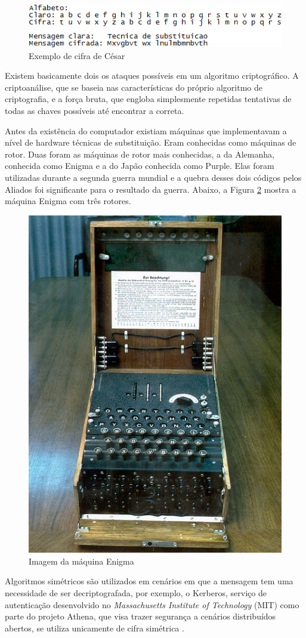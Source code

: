 \begin{figure}[H]
    \centering
    \caption{Exemplo de cifra de César}
    \label{fig:cifradecesar}
    \includegraphics{Figuras/CifraDeCesar.png}
\end{figure}

Existem basicamente dois os ataques possíveis em um algoritmo criptográfico. A criptoanálise, que se baseia nas características do próprio algoritmo de criptografia, e a força bruta, que engloba simplesmente repetidas tentativas de todas as chaves possíveis até encontrar a correta.

Antes da existência do computador existiam máquinas que implementavam a nível de hardware técnicas de substituição. Eram conhecidas como máquinas de rotor. Duas foram as máquinas de rotor mais conhecidas, a da Alemanha, conhecida como Enigma e a do Japão conhecida como Purple. Elas foram utilizadas durante a segunda guerra mundial e a quebra desses dois códigos pelos Aliados foi significante para o resultado da guerra. Abaixo, a Figura \ref{fig:maqenigma} mostra a máquina Enigma com três rotores.

\begin{figure}[H]
    \centering
    \caption{Imagem da máquina Enigma}
    \label{fig:maqenigma}
    \includegraphics[width=.35\linewidth]{Figuras/MaqEnigma.jpg}
\end{figure}

Algoritmos simétricos são utilizados em cenários em que a mensagem tem uma necessidade de ser decriptografada, por exemplo, o Kerberos, serviço de autenticação desenvolvido no \textit{Massachusetts Institute of Technology} (MIT) como parte do projeto Athena, que visa trazer segurança a cenários distribuídos abertos, se utiliza unicamente de cifra simétrica \cite{stallings14}.

